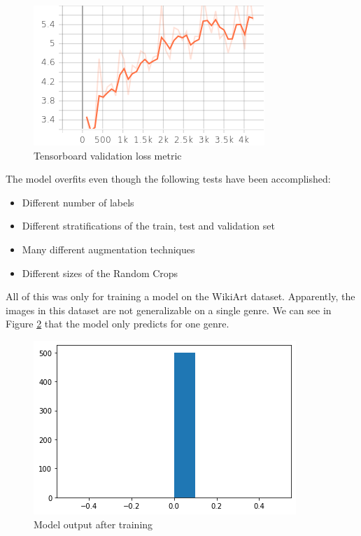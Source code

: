 \documentclass[conference]{IEEEtran}
\begin{document}
\begin{figure}
\centering
\includegraphics[width=1\linewidth]{../Imgs/val_loss}
\caption{Tensorboard validation loss metric}
\label{fig:val_loss}
\end{figure}

The model overfits even though the following tests have been accomplished:

\begin{itemize}
\item Different number of labels
\item Different stratifications of the train, test and validation set
\item Many different augmentation techniques
\item Different sizes of the Random Crops
\end{itemize} 

All of this was only for training a model on the WikiArt dataset. Apparently, the images in this dataset are not generalizable on a single genre. We can see in Figure \ref{fig:pred} that the model only predicts for one genre. 

\begin{figure}
\centering
\includegraphics[width=1\linewidth]{../Imgs/prediction_nn}
\caption{Model output after training}
\label{fig:pred}
\end{figure}
\end{document}

